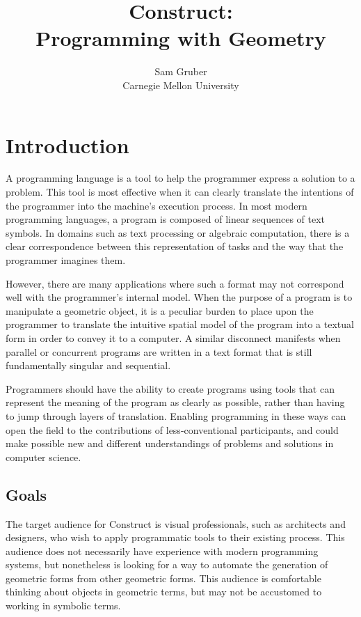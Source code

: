 \documentclass[twoside,11pt]{report}
\title{\bf {\Huge Construct}:\\{\LARGE Programming with Geometry}}
\author{{\Large Sam Gruber}\\Carnegie Mellon University}
\begin{document}
\maketitle

\chapter{Introduction}
\label{chap:intro}

A programming language is a tool to help the programmer express a solution to a problem.
This tool is most effective when it can clearly translate the intentions of the programmer into the machine's execution process. 
In most modern programming languages, a program is composed of linear sequences of text symbols.
In domains such as text processing or algebraic computation, there is a clear correspondence between this representation of tasks and the way that the programmer imagines them.

However, there are many applications where such a format may not correspond well with the programmer's internal model. 
When the purpose of a program is to manipulate a geometric object, it is a peculiar burden to place upon the programmer to translate the intuitive spatial model of the program into a textual form in order to convey it to a computer. 
A similar disconnect manifests when parallel or concurrent programs are written in a text format that is still fundamentally singular and sequential.

Programmers should have the ability to create programs using tools that can represent the meaning of the program as clearly as possible, rather than having to jump through layers of translation. 
Enabling programming in these ways can open the field to the contributions of less-conventional participants, and could make possible new and different understandings of problems and solutions in computer science.

\section{Goals}
\label{sec:goals}

The target audience for Construct is visual professionals, such as architects and designers, who wish to apply programmatic tools to their existing process.
This audience does not necessarily have experience with modern programming systems, but nonetheless is looking for a way to automate the generation of geometric forms from other geometric forms.
This audience is comfortable thinking about objects in geometric terms, but may not be accustomed to working in symbolic terms.
\end{document}
